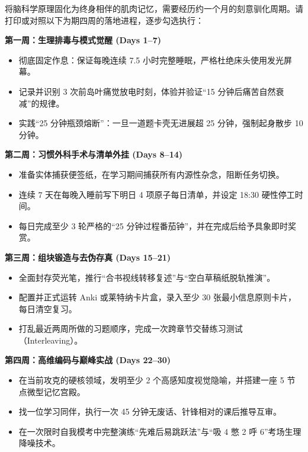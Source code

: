 \documentclass[12pt,a4paper,openany]{ctexbook}
\begin{document}
将脑科学原理固化为终身相伴的肌肉记忆，需要经历约一个月的刻意驯化周期。请打印或对照以下为期四周的落地进程，逐步勾选执行：

\begin{practicebox}[30天终身自驱学习系统落地日程表]
\textbf{第一周：生理排毒与模式觉醒 (Days 1--7)}
\begin{itemize}
    \item[$\square$] 彻底固定作息：保证每晚连续 7.5 小时完整睡眠，严格杜绝床头使用发光屏幕。
    \item[$\square$] 记录并识别 3 次前岛叶痛觉放电时刻，体验并验证“15 分钟后痛苦自然衰减”的规律。
    \item[$\square$] 实践“25 分钟瓶颈熔断”：一旦一道题卡壳无进展超 25 分钟，强制起身散步 10 分钟。
\end{itemize}

\textbf{第二周：习惯外科手术与清单外挂 (Days 8--14)}
\begin{itemize}
    \item[$\square$] 准备实体捕获便签纸，在学习期间捕获所有内源性杂念，阻断任务切换。
    \item[$\square$] 连续 7 天在每晚入睡前写下明日 4 项原子每日清单，并设定 18:30 硬性停工时间。
    \item[$\square$] 每日完成至少 3 轮严格的“25 分钟过程番茄钟”，并在完成后给予具象即时奖赏。
\end{itemize}

\textbf{第三周：组块锻造与去伪存真 (Days 15--21)}
\begin{itemize}
    \item[$\square$] 全面封存荧光笔，推行“合书视线转移复述”与“空白草稿纸脱轨推演”。
    \item[$\square$] 配置并正式运转 Anki 或莱特纳卡片盒，录入至少 30 张最小信息原则卡片，每日清空复习。
    \item[$\square$] 打乱最近两周所做的习题顺序，完成一次跨章节交替练习测试（Interleaving）。
\end{itemize}

\textbf{第四周：高维编码与巅峰实战 (Days 22--30)}
\begin{itemize}
    \item[$\square$] 在当前攻克的硬核领域，发明至少 2 个高感知度视觉隐喻，并搭建一座 5 节点微型记忆宫殿。
    \item[$\square$] 找一位学习同伴，执行一次 45 分钟无废话、针锋相对的课后推导互审。
    \item[$\square$] 在一次限时自我模考中完整演练“先难后易跳跃法”与“吸 4 憋 2 呼 6”考场生理降噪技术。
\end{itemize}
\end{practicebox}
\end{document}
